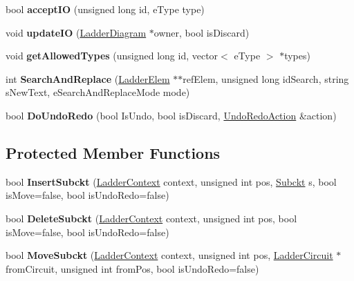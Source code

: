 \begin{DoxyCompactItemize}
\item 
\hypertarget{class_ladder_circuit_aac89d1e01b7aae3e36fdc71604fc5d3e}{bool {\bfseries accept\-I\-O} (unsigned long id, e\-Type type)}\label{class_ladder_circuit_aac89d1e01b7aae3e36fdc71604fc5d3e}

\item 
\hypertarget{class_ladder_circuit_a6b7ef8c843b326323dd39acd434f8586}{void {\bfseries update\-I\-O} (\hyperlink{class_ladder_diagram}{Ladder\-Diagram} $\ast$owner, bool is\-Discard)}\label{class_ladder_circuit_a6b7ef8c843b326323dd39acd434f8586}

\item 
\hypertarget{class_ladder_circuit_a9cc949fe8e38a5328dfd97aa6df52353}{void {\bfseries get\-Allowed\-Types} (unsigned long id, vector$<$ e\-Type $>$ $\ast$types)}\label{class_ladder_circuit_a9cc949fe8e38a5328dfd97aa6df52353}

\item 
\hypertarget{class_ladder_circuit_a8b655379fb8cc962442613a13fa55a0d}{int {\bfseries Search\-And\-Replace} (\hyperlink{class_ladder_elem}{Ladder\-Elem} $\ast$$\ast$ref\-Elem, unsigned long id\-Search, string s\-New\-Text, e\-Search\-And\-Replace\-Mode mode)}\label{class_ladder_circuit_a8b655379fb8cc962442613a13fa55a0d}

\item 
\hypertarget{class_ladder_circuit_a61a5b7626cfb6c901ae2e486cee70814}{bool {\bfseries Do\-Undo\-Redo} (bool Is\-Undo, bool is\-Discard, \hyperlink{struct_undo_redo_action}{Undo\-Redo\-Action} \&action)}\label{class_ladder_circuit_a61a5b7626cfb6c901ae2e486cee70814}

\end{DoxyCompactItemize}
\subsection*{Protected Member Functions}
\begin{DoxyCompactItemize}
\item 
\hypertarget{class_ladder_circuit_a9b09244456b4a2de644c4d73f5577631}{bool {\bfseries Insert\-Subckt} (\hyperlink{struct_ladder_context}{Ladder\-Context} context, unsigned int pos, \hyperlink{struct_subckt}{Subckt} s, bool is\-Move=false, bool is\-Undo\-Redo=false)}\label{class_ladder_circuit_a9b09244456b4a2de644c4d73f5577631}

\item 
\hypertarget{class_ladder_circuit_a5641009934e13486aeae24153d7d5f83}{bool {\bfseries Delete\-Subckt} (\hyperlink{struct_ladder_context}{Ladder\-Context} context, unsigned int pos, bool is\-Move=false, bool is\-Undo\-Redo=false)}\label{class_ladder_circuit_a5641009934e13486aeae24153d7d5f83}

\item 
\hypertarget{class_ladder_circuit_a2e13373e5b67f22115de421711358292}{bool {\bfseries Move\-Subckt} (\hyperlink{struct_ladder_context}{Ladder\-Context} context, unsigned int pos, \hyperlink{class_ladder_circuit}{Ladder\-Circuit} $\ast$from\-Circuit, unsigned int from\-Pos, bool is\-Undo\-Redo=false)}\label{class_ladder_circuit_a2e13373e5b67f22115de421711358292}

\end{DoxyCompactItemize}


